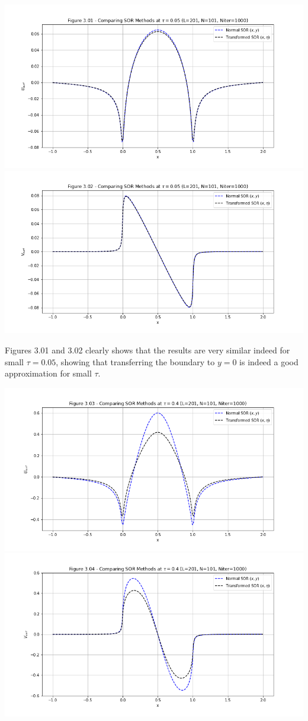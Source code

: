 \documentclass[12pt]{article}
\begin{document}
    \includegraphics[width=\textwidth]{fig3.01}
    \includegraphics[width=\textwidth]{fig3.02}

    Figures 3.01 and 3.02 clearly shows that the results are very similar indeed for small $\tau=0.05$, showing that transferring the boundary to $y=0$ is indeed a good approximation for small $\tau$.

    \includegraphics[width=\textwidth]{fig3.03}
    \includegraphics[width=\textwidth]{fig3.04}
\end{document}
